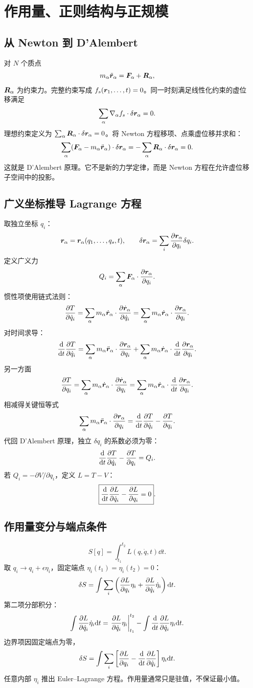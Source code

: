 \chapter{作用量、正则结构与正规模}

\section{从 Newton 到 D'Alembert}
对 $N$ 个质点
\[
m_\alpha\ddot{\bm{r}}_\alpha=\bm{F}_\alpha+\bm{R}_\alpha,
\]
$\bm{R}_\alpha$ 为约束力。完整约束写成
$f_s(\bm{r}_1,\ldots,t)=0$。同一时刻满足线性化约束的虚位移满足
\[
\sum_\alpha\nabla_\alpha f_s\cdot\delta\bm{r}_\alpha=0.
\]
理想约束定义为
$\sum_\alpha\bm{R}_\alpha\cdot\delta\bm{r}_\alpha=0$。将 Newton 方程移项、点乘虚位移并求和：
\[
\sum_\alpha(\bm{F}_\alpha-m_\alpha\ddot{\bm{r}}_\alpha)
\cdot\delta\bm{r}_\alpha
=-\sum_\alpha\bm{R}_\alpha\cdot\delta\bm{r}_\alpha=0.
\]
这就是 D'Alembert 原理。它不是新的力学定律，而是 Newton 方程在允许虚位移子空间中的投影。

\section{广义坐标推导 Lagrange 方程}
取独立坐标 $q_i$：
\[
\bm{r}_\alpha=\bm{r}_\alpha(q_1,\ldots,q_s,t),\qquad
\delta\bm{r}_\alpha=\sum_i\frac{\partial \bm{r}_\alpha}{\partial q_i}\delta q_i.
\]
定义广义力
\[
Q_i=\sum_\alpha\bm{F}_\alpha\cdot
\frac{\partial \bm{r}_\alpha}{\partial q_i}.
\]
惯性项使用链式法则：
\[
\frac{\partial T}{\partial \dot q_i}
=\sum_\alpha m_\alpha\dot{\bm{r}}_\alpha\cdot
\frac{\partial \dot{\bm{r}}_\alpha}{\partial \dot q_i}
=\sum_\alpha m_\alpha\dot{\bm{r}}_\alpha\cdot
\frac{\partial \bm{r}_\alpha}{\partial q_i}.
\]
对时间求导：
\[
\frac{\mathrm d }{\mathrm d t}\frac{\partial T}{\partial \dot q_i}
=\sum_\alpha m_\alpha\ddot{\bm{r}}_\alpha\cdot
\frac{\partial \bm{r}_\alpha}{\partial q_i}
+\sum_\alpha m_\alpha\dot{\bm{r}}_\alpha\cdot
\frac{\mathrm d }{\mathrm d t}\frac{\partial \bm{r}_\alpha}{\partial q_i}.
\]
另一方面
\[
\frac{\partial T}{\partial q_i}
=\sum_\alpha m_\alpha\dot{\bm{r}}_\alpha\cdot
\frac{\partial \dot{\bm{r}}_\alpha}{\partial q_i}
=\sum_\alpha m_\alpha\dot{\bm{r}}_\alpha\cdot
\frac{\mathrm d }{\mathrm d t}\frac{\partial \bm{r}_\alpha}{\partial q_i}.
\]
相减得关键恒等式
\[
\sum_\alpha m_\alpha\ddot{\bm{r}}_\alpha\cdot
\frac{\partial \bm{r}_\alpha}{\partial q_i}
=\frac{\mathrm d }{\mathrm d t}\frac{\partial T}{\partial \dot q_i}-\frac{\partial T}{\partial q_i}.
\]
代回 D'Alembert 原理，独立 $\delta q_i$ 的系数必须为零：
\[
\frac{\mathrm d }{\mathrm d t}\frac{\partial T}{\partial \dot q_i}-\frac{\partial T}{\partial q_i}=Q_i.
\]
若 $Q_i=-\partial V/\partial q_i$，定义 $L=T-V$：
\[
\boxed{\frac{\mathrm d }{\mathrm d t}\frac{\partial L}{\partial \dot q_i}-\frac{\partial L}{\partial q_i}=0}.
\]

\section{作用量变分与端点条件}
\[
S[q]=\int_{t_1}^{t_2}L(q,\dot q,t)\dd t.
\]
取 $q_i\to q_i+\epsilon\eta_i$，固定端点
$\eta_i(t_1)=\eta_i(t_2)=0$：
\[
\delta S=\int\sum_i\left(
\frac{\partial L}{\partial q_i}\eta_i+\frac{\partial L}{\partial \dot q_i}\dot\eta_i\right)\mathrm d t.
\]
第二项分部积分：
\[
\int\frac{\partial L}{\partial \dot q_i}\dot\eta_i\mathrm d t
=\left.\frac{\partial L}{\partial \dot q_i}\eta_i\right|_{t_1}^{t_2}
-\int\frac{\mathrm d }{\mathrm d t}\frac{\partial L}{\partial \dot q_i}\eta_i\mathrm d t.
\]
边界项因固定端点为零，
\[
\delta S=\int\sum_i\left[
\frac{\partial L}{\partial q_i}-\frac{\mathrm d }{\mathrm d t}\frac{\partial L}{\partial \dot q_i}
\right]\eta_i\mathrm d t.
\]
任意内部 $\eta_i$ 推出 Euler--Lagrange 方程。作用量通常只是驻值，不保证最小值。

